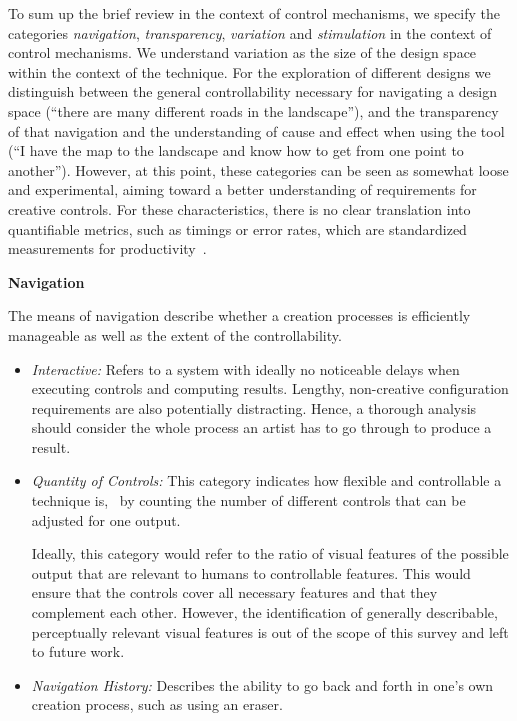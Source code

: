 To sum up the brief review in the context of control mechanisms, we specify the categories \textit{navigation}, \textit{transparency}, \textit{variation} and \textit{stimulation} in the context of control mechanisms. We understand variation as the size of the design space within the context of the technique. For the exploration of different designs we distinguish between the general controllability necessary for navigating a design space (``there are many different roads in the landscape''), and the transparency of that navigation and the understanding of cause and effect when using the tool (``I have the map to the landscape and know how to get from one point to another'').  However, at this point, these categories can be seen as somewhat loose and experimental, aiming toward a better understanding of requirements for creative controls. For these characteristics, there is no clear translation into quantifiable metrics, such as timings or error rates, which are standardized measurements for productivity~\cite{cherry_2014_qcs,shneiderman_2007_cst}.

\noindent\textbf{Navigation}

The means of navigation describe whether a creation processes is efficiently manageable as well as the extent of the controllability.

\begin{itemize}
    \item \textit{Interactive:} Refers to a system with ideally no noticeable delays when executing controls and computing results. Lengthy, non-creative configuration requirements are also potentially distracting. Hence, a thorough analysis should consider the whole process an artist has to go through to produce a result.
    \item \textit{Quantity of Controls:} This category indicates how flexible and controllable a technique is, \eg~by counting the number of different controls that can be adjusted for one output. 

    Ideally, this category would refer to the ratio of visual features of the possible output that are relevant to humans to controllable features. This would ensure that the controls cover all necessary features and that they complement each other. However, the identification of generally describable, perceptually relevant visual features is out of the scope of this survey and left to future work.

    \item \textit{Navigation History:} Describes the ability to go back and forth in one's own creation process, such as using an eraser.
\end{itemize}



